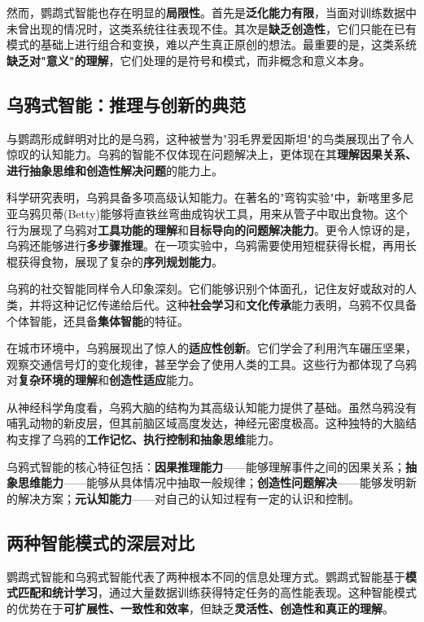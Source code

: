 然而，鹦鹉式智能也存在明显的{\bf 局限性}。首先是{\bf 泛化能力有限}，当面对训练数据中未曾出现的情况时，这类系统往往表现不佳。其次是{\bf 缺乏创造性}，它们只能在已有模式的基础上进行组合和变换，难以产生真正原创的想法。最重要的是，这类系统{\bf 缺乏对"意义"的理解}，它们处理的是符号和模式，而非概念和意义本身。

\subsection*{乌鸦式智能：推理与创新的典范}

与鹦鹉形成鲜明对比的是乌鸦，这种被誉为"羽毛界爱因斯坦"的鸟类展现出了令人惊叹的认知能力。乌鸦的智能不仅体现在问题解决上，更体现在其{\bf 理解因果关系、进行抽象思维和创造性解决问题}的能力上。

科学研究表明，乌鸦具备多项高级认知能力。在著名的"弯钩实验"中，新喀里多尼亚乌鸦贝蒂(Betty)能够将直铁丝弯曲成钩状工具，用来从管子中取出食物。这个行为展现了乌鸦对{\bf 工具功能的理解}和{\bf 目标导向的问题解决能力}。更令人惊讶的是，乌鸦还能够进行{\bf 多步骤推理}。在一项实验中，乌鸦需要使用短棍获得长棍，再用长棍获得食物，展现了复杂的{\bf 序列规划能力}。

乌鸦的社交智能同样令人印象深刻。它们能够识别个体面孔，记住友好或敌对的人类，并将这种记忆传递给后代。这种{\bf 社会学习}和{\bf 文化传承}能力表明，乌鸦不仅具备个体智能，还具备{\bf 集体智能}的特征。

在城市环境中，乌鸦展现出了惊人的{\bf 适应性创新}。它们学会了利用汽车碾压坚果，观察交通信号灯的变化规律，甚至学会了使用人类的工具。这些行为都体现了乌鸦对{\bf 复杂环境的理解}和{\bf 创造性适应}能力。

从神经科学角度看，乌鸦大脑的结构为其高级认知能力提供了基础。虽然乌鸦没有哺乳动物的新皮层，但其前脑区域高度发达，神经元密度极高。这种独特的大脑结构支撑了乌鸦的{\bf 工作记忆、执行控制和抽象思维}能力。

乌鸦式智能的核心特征包括：{\bf 因果推理能力}——能够理解事件之间的因果关系；{\bf 抽象思维能力}——能够从具体情况中抽取一般规律；{\bf 创造性问题解决}——能够发明新的解决方案；{\bf 元认知能力}——对自己的认知过程有一定的认识和控制。

\subsection*{两种智能模式的深层对比}

鹦鹉式智能和乌鸦式智能代表了两种根本不同的信息处理方式。鹦鹉式智能基于{\bf 模式匹配和统计学习}，通过大量数据训练获得特定任务的高性能表现。这种智能模式的优势在于{\bf 可扩展性、一致性和效率}，但缺乏{\bf 灵活性、创造性和真正的理解}。

